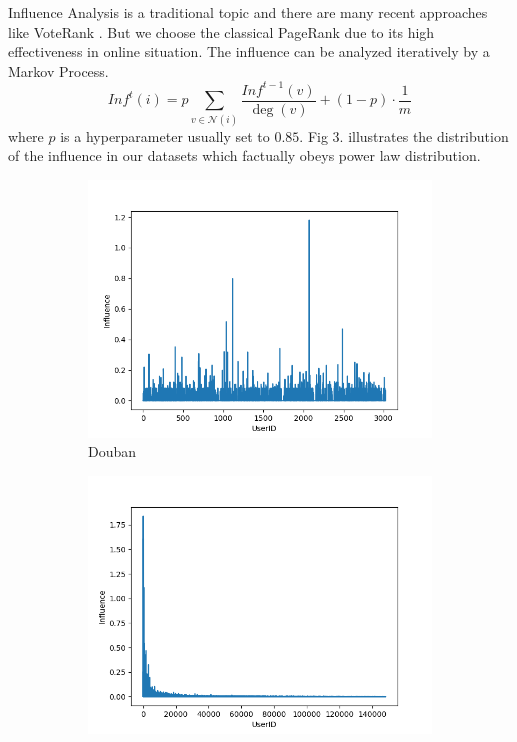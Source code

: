 \documentclass{article}
\begin{document}
Influence Analysis is a traditional topic and there are many recent approaches like VoteRank \cite{zhang2016voterank}.
But we choose the classical PageRank \cite{ser1998pagerank} due to its high effectiveness in online situation. 
The influence can be analyzed iteratively by a Markov Process.
\begin{equation}
   Inf^t(i) = p \sum_{v \in \mathcal{N}(i)} \frac{Inf^{t-1}(v)}{\deg(v)} + (1-p) \cdot \frac{1}{m}
\end{equation}
where $p$ is a hyperparameter usually set to $0.85$. 
Fig 3. illustrates the distribution of the influence in our datasets 
which factually obeys power law distribution.
\begin{figure}[h]    
    \centering
    \begin{subfigure}{0.33\textwidth}
      \centering
        \includegraphics[width=1\linewidth]{pic/figure3_1.png}
      \caption{Douban}
    \end{subfigure}%
    \begin{subfigure}{0.33\textwidth}
    \centering
        \includegraphics[width=1\linewidth]{pic/figure3_2.png}

\end{subfigure}
\end{figure}
\end{document}
